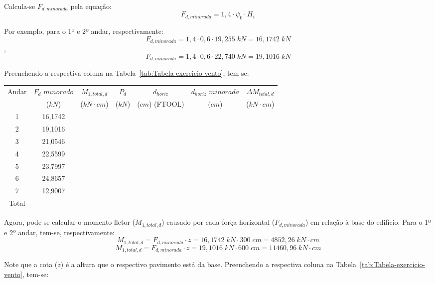 Calcula-se $F_{d, minorada}$ pela equação: $$F_{d, minorada}=1,4\cdot\psi_0\cdot H_v$$

Por exemplo, para o 1º e 2º andar, respectivamente: $$F_{d, minorada}=1,4\cdot 0,6\cdot 19,255\;kN=16,1742\;kN$$, $$F_{d, minorada}=1,4\cdot 0,6\cdot 22,740\;kN=19,1016\;kN$$

Preenchendo a respectiva coluna na Tabela~\ref{tab:Tabela-exercicio-vento}, tem-se:

\begin{table}[H]
\centering
\begin{tabular}{c|c|c|ccc|c}
\hline
Andar & $F_d$ $minorado$ & $M_{1, total, d}$ & \multicolumn{1}{c|}{$P_d$} & \multicolumn{1}{c|}{$d_{horiz}$} & $d_{horiz}$ $minorada$ & $\Delta M_{total, d}$ \\
 & ($kN$) & ($kN\cdot cm$) & \multicolumn{1}{c|}{($kN$)} & \multicolumn{1}{c|}{($cm$) (FTOOL)} & ($cm$) & ($kN\cdot cm$) \\ \hline
1 & 16,1742 &  & \multicolumn{1}{c|}{} & \multicolumn{1}{c|}{} &  &  \\
2 & 19,1016 &  & \multicolumn{1}{c|}{} & \multicolumn{1}{c|}{} &  &  \\
3 & 21,0546 &  & \multicolumn{1}{c|}{} & \multicolumn{1}{c|}{} &  &  \\
4 & 22,5599 &  & \multicolumn{1}{c|}{} & \multicolumn{1}{c|}{} &  &  \\
5 & 23,7997 &  & \multicolumn{1}{c|}{} & \multicolumn{1}{c|}{} &  &  \\
6 & 24,8657 &  & \multicolumn{1}{c|}{} & \multicolumn{1}{c|}{} &  &  \\
7 & 12,9007 &  & \multicolumn{1}{c|}{} & \multicolumn{1}{c|}{} &  &  \\ \hline
Total &  &  &  &  &  &  \\ \cline{1-1} \cline{3-3} \cline{7-7} 
\end{tabular}
\end{table}

Agora, pode-se calcular o momento fletor ($M_{1, total, d}$) causado por cada força horizontal ($F_{d, minorada}$) em relação à base do edifício. Para o 1º e 2º andar, tem-se, respectivamente:
$$M_{1, total, d}=F_{d, minorada}\cdot z=16,1742\;kN\cdot 300\;cm=4852,26\;kN\cdot cm$$
$$M_{1, total, d}=F_{d, minorada}\cdot z=19,1016\;kN\cdot 600\;cm=11460,96\;kN\cdot cm$$

Note que a cota ($z$) é a altura que o respectivo pavimento está da base. Preenchendo a respectiva coluna na Tabela~\ref{tab:Tabela-exercicio-vento}, tem-se:

